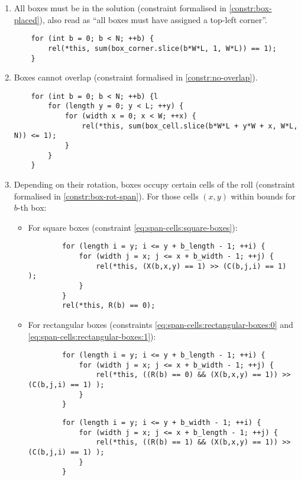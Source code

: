 \begin{enumerate}
	\item All boxes must be in the solution (constraint formalised in
	\ref{constr:box-placed}), also read as ``all boxes must have assigned a top-left corner''.
    
	{\NOINDENT \begin{lstlisting}
	for (int b = 0; b < N; ++b) {
		rel(*this, sum(box_corner.slice(b*W*L, 1, W*L)) == 1);
	}
	\end{lstlisting}}
    
	\item Boxes cannot overlap (constraint formalised in \ref{constr:no-overlap}).
    
	{\NOINDENT \begin{lstlisting}
	for (int b = 0; b < N; ++b) {l
		for (length y = 0; y < L; ++y) {
			for (width x = 0; x < W; ++x) {
				rel(*this, sum(box_cell.slice(b*W*L + y*W + x, W*L, N)) <= 1);
			}
		}
	}
	\end{lstlisting}}
    
	\item Depending on their rotation, boxes occupy certain cells of the roll
	(constraint formalised in \ref{constr:box-rot-span}). For those cells $(x,y)$ within
	bounds for $b$-th box:

	\begin{itemize}
		\item For square boxes (constraint \ref{eq:span-cells:square-boxes}):
		{\NOINDENT \begin{lstlisting}
		for (length i = y; i <= y + b_length - 1; ++i) {
			for (width j = x; j <= x + b_width - 1; ++j) {
				rel(*this, (X(b,x,y) == 1) >> (C(b,j,i) == 1) );
			}
		}
		rel(*this, R(b) == 0);
		\end{lstlisting}}
		
		\item For rectangular boxes (constraints \ref{eq:span-cells:rectangular-boxes:0} and
		\ref{eq:span-cells:rectangular-boxes:1}):
		{\NOINDENT \begin{lstlisting}
		for (length i = y; i <= y + b_length - 1; ++i) {
			for (width j = x; j <= x + b_width - 1; ++j) {
				rel(*this, ((R(b) == 0) && (X(b,x,y) == 1)) >> (C(b,j,i) == 1) );
			}
		}
		\end{lstlisting}}
		{\NOINDENT \begin{lstlisting}
		for (length i = y; i <= y + b_width - 1; ++i) {
			for (width j = x; j <= x + b_length - 1; ++j) {
				rel(*this, ((R(b) == 1) && (X(b,x,y) == 1)) >> (C(b,j,i) == 1) );
			}
		}
		\end{lstlisting}}
	\end{itemize}
    

\end{enumerate}
